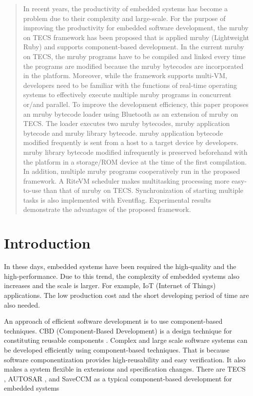 \documentclass[a4j,12pt,oneside,openany,english]{jsbook}
\begin{document}
\begin{abstract}
In recent years, the productivity of embedded systems has become a problem due to their complexity and large-scale.
For the purpose of improving the productivity for embedded software development, the mruby on TECS framework has been proposed that is applied mruby (Lightweight Ruby) and supports component-based development.
In the current mruby on TECS, the mruby programs have to be compiled and linked every time the programs are modified because the mruby bytecodes are incorporated in the platform.
Moreover, while the framework supports multi-VM, developers need to be familiar with the functions of real-time operating systems to effectively execute multiple mruby programs in concurrent or/and parallel.
To improve the development efficiency, this paper proposes an mruby bytecode loader using Bluetooth as an extension of mruby on TECS.
The loader executes two mruby bytecodes, mruby application bytecode and mruby library bytecode.
mruby application bytecode modified frequently is sent from a host to a target device by developers.
mruby library bytecode modified infrequently is preserved beforehand with the platform in a storage/ROM device at the time of the first compilation.
In addition, multiple mruby programs cooperatively run in the proposed framework.
A RiteVM scheduler makes multitasking processing more easy-to-use than that of mruby on TECS.
Synchronization of starting multiple tasks is also implemented with Eventflag. 
Experimental results demonstrate the advantages of the proposed framework.
\end{abstract}
\clearpage
\tableofcontents
\clearpage
\setcounter{page}{0}
\chapter{Introduction}
In these days, embedded systems have been required the high-quality and the high-performance.
Due to this trend, the complexity of embedded systems also increases and the scale is larger.
For example, IoT (Internet of Things) applications.
The low production cost and the short developing period of time are also needed.

An approach of efficient software development is to use component-based techniques.
CBD (Component-Based Development) is a design technique for constituting reusable components \cite{par:Crnkovic}.
Complex and large scale software systems can be developed efficiently using component-based techniques.
That is because software componentization provides high-reusability and easy verification.
It also makes a system flexible in extensions and specification changes.
There are TECS \cite{par:TECS}, AUTOSAR \cite{url:AUTOSAR}, and SaveCCM \cite{par:SAVEapproach} as a typical component-based development for embedded systems 
\end{document}
